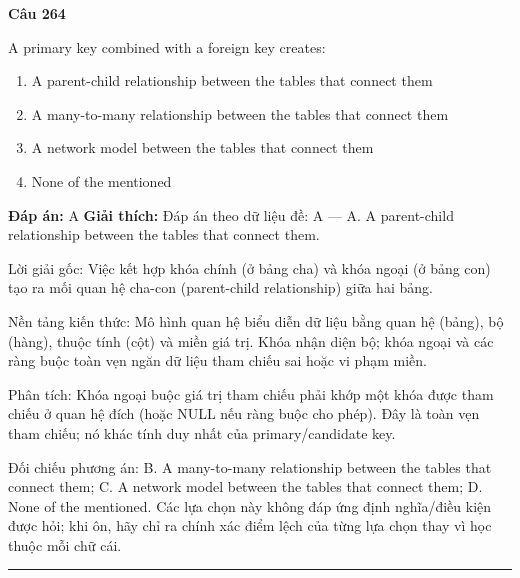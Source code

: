 \documentclass[11pt,a4paper]{article}
\newenvironment{question}[1]{%
  \par\vspace{1em}\noindent\textbf{\large Câu #1}\par\vspace{0.4em}
}{%
  \par\vspace{1em}\hrule\vspace{0.6em}
}
\newenvironment{choices}{%
  \begin{enumerate}[label=\textbf{\Alph*.},leftmargin=2.2em,itemsep=2pt,topsep=3pt]
}{%
  \end{enumerate}
}
\newcommand{\choice}{\item}
\begin{document}
\begin{question}{264}
A primary key combined with a foreign key creates:
\begin{choices}
\choice A parent-child relationship between the tables that connect them
\choice A many-to-many relationship between the tables that connect them
\choice A network model between the tables that connect them
\choice None of the mentioned
\end{choices}
\textbf{Đáp án:} A
\textbf{Giải thích:} Đáp án theo dữ liệu đề: A — A. A parent-child relationship between the tables that connect them.

Lời giải gốc: Việc kết hợp khóa chính (ở bảng cha) và khóa ngoại (ở bảng con) tạo ra mối quan hệ cha-con (parent-child relationship) giữa hai bảng.

Nền tảng kiến thức: Mô hình quan hệ biểu diễn dữ liệu bằng quan hệ (bảng), bộ (hàng), thuộc tính (cột) và miền giá trị. Khóa nhận diện bộ; khóa ngoại và các ràng buộc toàn vẹn ngăn dữ liệu tham chiếu sai hoặc vi phạm miền.

Phân tích: Khóa ngoại buộc giá trị tham chiếu phải khớp một khóa được tham chiếu ở quan hệ đích (hoặc NULL nếu ràng buộc cho phép). Đây là toàn vẹn tham chiếu; nó khác tính duy nhất của primary/candidate key.

Đối chiếu phương án: B. A many-to-many relationship between the tables that connect them; C. A network model between the tables that connect them; D. None of the mentioned. Các lựa chọn này không đáp ứng định nghĩa/điều kiện được hỏi; khi ôn, hãy chỉ ra chính xác điểm lệch của từng lựa chọn thay vì học thuộc mỗi chữ cái.
\end{question}
\end{document}
